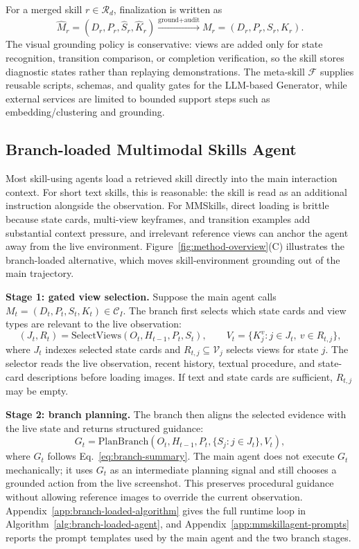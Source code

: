 For a merged skill $r\in\mathcal{R}_d$, finalization is written as
\begin{equation}
    \widehat{M}_r=(D_r,P_r,\widehat{S}_r,\widehat{K}_r)
    \xrightarrow{\text{ground+audit}}
    M_r=(D_r,P_r,S_r,K_r).
\end{equation}
The visual grounding policy is conservative: views are added only for state recognition, transition comparison, or completion verification, so the skill stores diagnostic states rather than replaying demonstrations. The meta-skill $\mathcal{F}$ supplies reusable scripts, schemas, and quality gates for the LLM-based Generator, while external services are limited to bounded support steps such as embedding/clustering and grounding.

\subsection{Branch-loaded Multimodal Skills Agent}
\label{sec:method-branch}

Most skill-using agents load a retrieved skill directly into the main interaction context. For short text skills, this is reasonable: the skill is read as an additional instruction alongside the observation. For MMSkills, direct loading is brittle because state cards, multi-view keyframes, and transition examples add substantial context pressure, and irrelevant reference views can anchor the agent away from the live environment. Figure~\ref{fig:method-overview}(C) illustrates the branch-loaded alternative, which moves skill-environment grounding out of the main trajectory.

\textbf{Stage 1: gated view selection.} Suppose the main agent calls $M_t=(D_t,P_t,S_t,K_t)\in\mathcal{C}_I$. The branch first selects which state cards and view types are relevant to the live observation:
\begin{equation}
    (J_t,R_t)=\text{SelectViews}(O_t,H_{t-1},P_t,S_t),
    \qquad
    V_t=\{K_j^v:j\in J_t,\ v\in R_{t,j}\},
    \label{eq:branch-stage1}
\end{equation}
where $J_t$ indexes selected state cards and $R_{t,j}\subseteq\mathcal{V}_j$ selects views for state $j$. The selector reads the live observation, recent history, textual procedure, and state-card descriptions before loading images. If text and state cards are sufficient, $R_{t,j}$ may be empty.

\textbf{Stage 2: branch planning.} The branch then aligns the selected evidence with the live state and returns structured guidance:
\begin{equation}
    G_t=\text{PlanBranch}(O_t,H_{t-1},P_t,\{S_j:j\in J_t\},V_t),
    \label{eq:branch-stage2}
\end{equation}
where $G_t$ follows Eq.~\ref{eq:branch-summary}. The main agent does not execute $G_t$ mechanically; it uses $G_t$ as an intermediate planning signal and still chooses a grounded action from the live screenshot. This preserves procedural guidance without allowing reference images to override the current observation. Appendix~\ref{app:branch-loaded-algorithm} gives the full runtime loop in Algorithm~\ref{alg:branch-loaded-agent}, and Appendix~\ref{app:mmskillagent-prompts} reports the prompt templates used by the main agent and the two branch stages.
